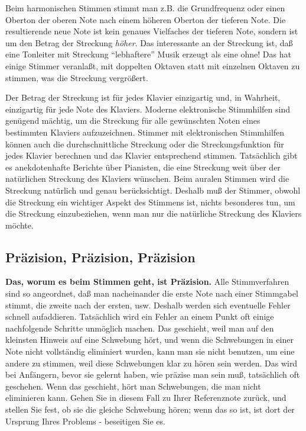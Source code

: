 Beim harmonischen Stimmen stimmt man z.B. die Grundfrequenz oder einen Oberton der oberen Note nach einem höheren Oberton der tieferen Note.
 Die resultierende neue Note ist kein genaues Vielfaches der tieferen Note, sondern ist um den Betrag der Streckung \textit{höher}.
 Das interessante an der Streckung ist, daß eine Tonleiter mit Streckung \enquote{lebhaftere} Musik erzeugt als eine ohne!
 Das hat einige Stimmer veranlaßt, mit doppelten Oktaven statt mit einzelnen Oktaven zu stimmen, was die Streckung vergrößert.
 

Der Betrag der Streckung ist für jedes Klavier einzigartig und, in Wahrheit, einzigartig für jede Note des Klaviers.
 Moderne elektronische Stimmhilfen sind genügend mächtig, um die Streckung für alle gewünschten Noten eines bestimmten Klaviers aufzuzeichnen.
 Stimmer mit elektronischen Stimmhilfen können auch die durchschnittliche Streckung oder die Streckungsfunktion für jedes Klavier berechnen und das Klavier entsprechend stimmen.
 Tatsächlich gibt es anekdotenhafte Berichte über Pianisten, die eine Streckung weit über der natürlichen Streckung des Klaviers wünschen.
 Beim auralen Stimmen wird die Streckung natürlich und genau berücksichtigt.
 Deshalb muß der Stimmer, obwohl die Streckung ein wichtiger Aspekt des Stimmens ist, nichts besonderes tun, um die Streckung einzubeziehen, wenn man nur die natürliche Streckung des Klaviers möchte.
 \hypertarget{c2_5l}{}\hypertarget{c2_5_prae}{}

\subsection{Präzision, Präzision, Präzision}

\textbf{Das, worum es beim Stimmen geht, ist Präzision.}
 Alle Stimmverfahren sind so angeordnet, daß man nacheinander die erste Note nach einer Stimmgabel stimmt, die zweite nach der ersten, usw.
 Deshalb werden sich eventuelle Fehler schnell aufaddieren.
 Tatsächlich wird ein Fehler an einem Punkt oft einige nachfolgende Schritte unmöglich machen.
 Das geschieht, weil man auf den kleinsten Hinweis auf eine Schwebung hört, und wenn die Schwebungen in einer Note nicht vollständig eliminiert wurden, kann man sie nicht benutzen, um eine andere zu stimmen, weil diese Schwebungen klar zu hören sein werden.
 Das wird bei Anfängern, bevor sie gelernt haben, wie präzise man sein muß, tatsächlich oft geschehen.
 Wenn das geschieht, hört man Schwebungen, die man nicht eliminieren kann.
 Gehen Sie in diesem Fall zu Ihrer Referenznote zurück, und stellen Sie fest, ob sie die gleiche Schwebung hören; wenn das so ist, ist dort der Ursprung Ihres Problems - beseitigen Sie es.
 


